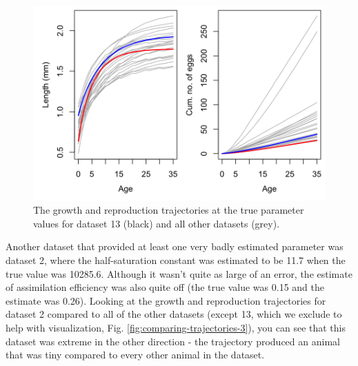 \documentclass[12pt,reqno,final,pdftex]{amsart}\usepackage[]{graphicx}\usepackage[]{color}
\newenvironment{knitrout}{}{} %
\theoremstyle{plain}
\numberwithin{equation}{part}
\begin{document}
\begin{knitrout}\scriptsize
{}\color{fgcolor}\begin{figure}

\includegraphics[width=\linewidth]{figure/comparing-trajectories-1} \hfill{}

\caption[The growth and reproduction trajectories at the true parameter values for dataset 13 (black) and all other datasets (grey)]{The growth and reproduction trajectories at the true parameter values for dataset 13 (black) and all other datasets (grey).}\label{fig:comparing-trajectories}
\end{figure}


\end{knitrout}

Another dataset that provided at least one very badly estimated parameter was dataset 2, where the half-saturation constant was estimated to be 11.7 when the true value was 10285.6.
Although it wasn't quite as large of an error, the estimate of assimilation efficiency was also quite off (the true value was 0.15 and the estimate was 0.26).
Looking at the growth and reproduction trajectories for dataset 2 compared to all of the other datasets (except 13, which we exclude to help with visualization, Fig. \ref{fig:comparing-trajectories-3}), you can see that this dataset was extreme in the other direction - the trajectory produced an animal that was tiny compared to every other animal in the dataset.
\end{document}
